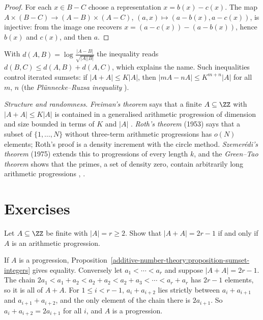 \begin{proof}
For each $x \in B - C$ choose a representation $x = b(x) - c(x)$. The map $A \times (B - C) \to (A - B) \times (A - C)$, $(a, x) \mapsto (a - b(x), a - c(x))$, is injective: from the image one recovers
$x = (a - c(x)) - (a - b(x))$, hence $b(x)$ and $c(x)$, and then $a$.
\end{proof}

With $d(A, B) = \log\frac{|A - B|}{\sqrt{|A||B|}}$ the inequality reads $d(B, C) \leq d(A, B) + d(A, C)$, which explains the name. Such inequalities control iterated sumsets: if $|A + A| \leq K|A|$, then
$|mA - nA| \leq K^{m+n}|A|$ for all $m$, $n$ (the \emph{Pl\"unnecke--Ruzsa inequality} \cite{tao-vu-additive}).

\begin{remark}\label{additive-number-theory:remark-additive-structure}
\emph{Structure and randomness.} \emph{Freiman's theorem} says that a finite $A \subseteq \ZZ$ with $|A + A| \leq K|A|$ is contained in a generalised arithmetic progression of dimension and size bounded in terms of $K$
and $|A|$ \cite{tao-vu-additive}. \emph{Roth's theorem} (1953) says that a subset of $\{1, \ldots, N\}$ without three-term arithmetic progressions has $o(N)$ elements; Roth's proof is a density increment with the
circle method. \emph{Szemer\'edi's theorem} (1975) extends this to progressions of every length $k$, and the \emph{Green--Tao theorem} shows that the primes, a set of density zero, contain arbitrarily long
arithmetic progressions \cite{green-tao}, \cite{tao-vu-additive}.
\end{remark}

\section{Exercises}\label{additive-number-theory:section-exercises}

\begin{exercise}\label{additive-number-theory:exercise-sumset-equality}
Let $A \subseteq \ZZ$ be finite with $|A| = r \geq 2$. Show that $|A + A| = 2r - 1$ if and only if $A$ is an arithmetic progression.
\end{exercise}

\begin{solution}
If $A$ is a progression, Proposition~\ref{additive-number-theory:proposition-sumset-integers} gives equality. Conversely let $a_1 < \cdots < a_r$ and suppose $|A + A| = 2r - 1$. The chain
$2a_1 < a_1 + a_2 < a_2 + a_2 < a_2 + a_3 < \cdots < a_r + a_r$ has $2r - 1$ elements, so it is all of $A + A$. For $1 \leq i < r - 1$, $a_i + a_{i+2}$ lies strictly between $a_i + a_{i+1}$ and
$a_{i+1} + a_{i+2}$, and the only element of the chain there is $2a_{i+1}$. So $a_i + a_{i+2} = 2a_{i+1}$ for all $i$, and $A$ is a progression.
\end{solution}

